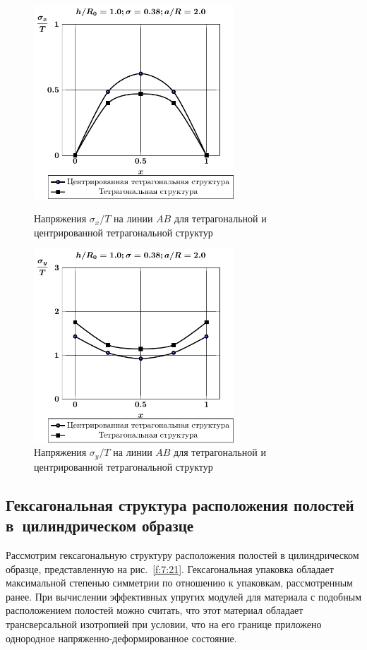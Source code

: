 \begin{figure}[h!]
\centering\footnotesize
\parbox[b]{7.5cm}{\centering\includegraphics[width=7.5cm]{cav5-4-sig_x.pdf}
\caption{Напряжения $\sigma_x/T$ на линии $AB$ для тетрагональной и центрированной тетрагональной структур
\label{f:7:19}}}\hfil\hfil
\parbox[b]{7.5cm}{\centering\includegraphics[width=7.5cm]{cav5-4-sig_y.pdf}
\caption{Напряжения $\sigma_y/T$ на линии $AB$ для тетрагональной и центрированной тетрагональной структур
\label{f:7:20}}}
\end{figure}

\subsection{Гексагональная структура расположения полостей в~цилиндрическом образце}

Рассмотрим гексагональную структуру расположения полостей в цилиндрическом образце, представленную на рис.~\ref{f:7:21}. Гексагональная упаковка обладает максимальной степенью симметрии по отношению к упаковкам, рассмотренным ранее. При вычислении эффективных упругих модулей для материала с подобным расположением полостей можно считать, что этот материал обладает трансверсальной изотропией при условии, что на его границе приложено однородное напряженно-деформированное состояние.


